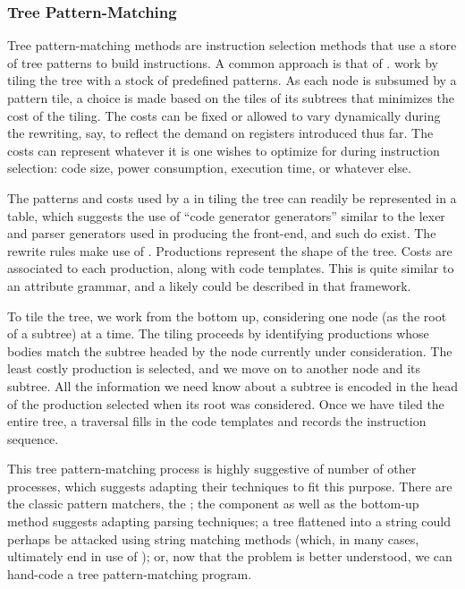 \subsubsection{Tree Pattern-Matching}
Tree pattern-matching methods are instruction selection methods that use a store of tree patterns to build instructions. A common approach is that of .  work by tiling the tree with a stock of predefined patterns. As each node is subsumed by a pattern tile, a choice is made based on the tiles of its subtrees that minimizes the cost of the tiling. The costs can be fixed or allowed to vary dynamically during the rewriting, say, to reflect the demand on registers introduced thus far. The costs can represent whatever it is one wishes to optimize for during instruction selection: code size, power consumption, execution time, or whatever else.

The patterns and costs used by a  in tiling the tree can readily be represented in a table, which suggests the use of ``code generator generators'' similar to the lexer and parser generators used in producing the front-end, and such do exist. The rewrite rules make use of \CFGs{}. Productions represent the shape of the tree. Costs are associated to each production, along with code templates. This is quite similar to an attribute grammar, and a  likely could be described in that framework.

To tile the tree, we work from the bottom up, considering one node (as the root of a subtree) at a time. The tiling proceeds by identifying productions whose bodies match the subtree headed by the node currently under consideration. The least costly production is selected, and we move on to another node and its subtree. All the information we need know about a subtree is encoded in the head of the production selected when its root was considered. Once we have tiled the entire tree, a traversal fills in the code templates and records the instruction sequence.

This tree pattern-matching process is highly suggestive of number of other processes, which suggests adapting their techniques to fit this purpose. There are the classic pattern matchers, the \FAs{}; the \CFG component as well as the bottom-up method suggests adapting parsing techniques; a tree flattened into a string could perhaps be attacked using string matching methods (which, in many cases, ultimately end in use of \FAs); or, now that the problem is better understood, we can hand-code a tree pattern-matching program.

